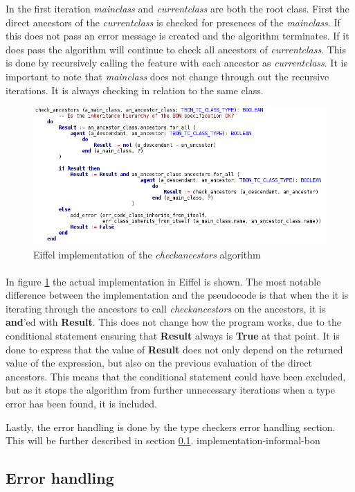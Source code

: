 In the first iteration \textit{main}\textunderscore\textit{class} and \textit{current}\textunderscore\textit{class} are both the root class. First the direct ancestors of the \textit{current}\textunderscore\textit{class}  is checked for presences of the \textit{main}\textunderscore\textit{class}. If this does not pass an error message is created and the algorithm terminates. If it does pass the algorithm will continue to check all ancestors of \textit{current}\textunderscore\textit{class}. This is done by recursively calling the feature with each ancestor as \textit{current}\textunderscore\textit{class}. It is important to note that \textit{main}\textunderscore\textit{class} does not change through out the recursive iterations. It is always checking in relation to the same class.

\begin{figure}
\centerline{
\includegraphics[scale=0.7]{images/check_ancestors_eiffel_code.png}
}
\caption{Eiffel implementation of the \textit{check}\textunderscore\textit{ancestors} algorithm}
\label{fig:eiffel_check_ancestors}
\end{figure}

\paragraph{}
In figure \ref{fig:eiffel_check_ancestors} the actual implementation in Eiffel is shown. The most notable difference between the implementation and the pseudocode is that when the it is iterating through the ancestors to call \textit{check}\textunderscore\textit{ancestors} on the ancestors, it is \textbf{and}'ed with \textbf{Result}. This does not change how the program works, due to the conditional statement ensuring that \textbf{Result} always is \textbf{True} at that point. It is done to express that the value of \textbf{Result} does not only depend on the returned value of the expression, but also on the previous evaluation of the direct ancestors. This means that the conditional statement could have been excluded, but as it stops the algorithm from further unnecessary iterations when a type error has been found, it is included.

Lastly, the error handling is done by the type checkers error handling section. This will be further described in section \ref{implementation-error-handling}.
{implementation-informal-bon}

\subsection{Error handling}
\label{implementation-error-handling}